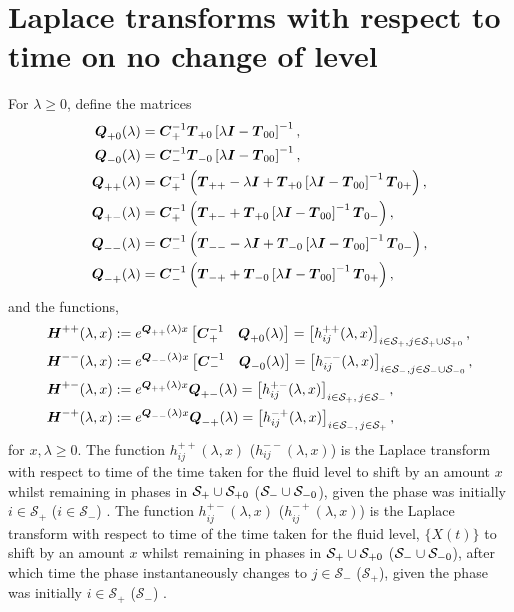 \section{Laplace transforms with respect to time on no change of level}\label{sec: lst on no change}
For \(\lambda \geq 0\), define the matrices
\begin{align*}
	\boldsymbol Q_{+0}(\lambda) &= \boldsymbol C_+^{-1}\boldsymbol T_{+0}\left[\lambda \boldsymbol I - \boldsymbol T_{00}\right]^{-1},
	\\\boldsymbol Q_{-0}(\lambda) &= \boldsymbol C_-^{-1}\boldsymbol T_{-0}\left[\lambda \boldsymbol I - \boldsymbol T_{00}\right]^{-1},
	\\\boldsymbol Q_{++}(\lambda) &= \boldsymbol C_+^{-1} \left(\boldsymbol T_{++} - \lambda \boldsymbol I + \boldsymbol T_{+0}\left[\lambda \boldsymbol I - \boldsymbol T_{00}\right]^{-1}\boldsymbol T_{0+}\right),
	\\\boldsymbol Q_{+-}(\lambda) &= \boldsymbol C_+^{-1} \left(\boldsymbol T_{+-} + \boldsymbol T_{+0}\left[\lambda \boldsymbol I - \boldsymbol T_{00}\right]^{-1}\boldsymbol T_{0-} \right) ,
	\\\boldsymbol Q_{--}(\lambda) &= \boldsymbol C_-^{-1} \left(\boldsymbol T_{--}  - \lambda \boldsymbol I + \boldsymbol T_{-0}\left[\lambda \boldsymbol I - \boldsymbol T_{00}\right]^{-1}\boldsymbol T_{0-}\right),
	\\\boldsymbol Q_{-+}(\lambda) &=\boldsymbol C_-^{-1} \left(\boldsymbol T_{-+}+ \boldsymbol T_{-0}\left[\lambda \boldsymbol I - \boldsymbol T_{00}\right]^{-1}\boldsymbol T_{0+}\right) ,
\end{align*}
and the functions,
\begin{align}
	\boldsymbol H^{++}(\lambda,x) &:= e^{\boldsymbol{Q}_{++}(\lambda)x}\begin{bmatrix} \boldsymbol C_+^{-1} & \boldsymbol Q_{+0}(\lambda) \end{bmatrix} = \left[h_{ij}^{++}(\lambda,x)\right]_{i\in \mathcal S_+,j\in\mathcal S_{+}\cup\mathcal{S}_{+0}}, \label{eqn: lst 1}
	\\\boldsymbol H^{--}(\lambda,x) &:= e^{\boldsymbol{Q}_{--}(\lambda)x}\begin{bmatrix} \boldsymbol C_-^{-1} & \boldsymbol Q_{-0}(\lambda) \end{bmatrix} = \left[h_{ij}^{--}(\lambda,x)\right]_{i\in\mathcal S_-,j\in\mathcal S_{-}\cup\mathcal{S}_{-0}},
	\\\boldsymbol H^{+-}(\lambda,x) &:= e^{\boldsymbol{Q}_{++}(\lambda)x}\boldsymbol{Q}_{+-}(\lambda) = \left[h_{ij}^{+-}(\lambda,x)\right]_{i\in\mathcal S_+,\,j\in\mathcal S_-}, 
	\\\boldsymbol H^{-+}(\lambda,x) &:= e^{\boldsymbol{Q}_{--}(\lambda)x}\boldsymbol{Q}_{-+}(\lambda) = \left[h_{ij}^{-+}(\lambda,x)\right]_{i\in\mathcal S_-,\, j\in\mathcal S_+}, \label{eqn: lst 4}
\end{align}
for \(x,\lambda\geq 0\). The function \(h_{ij}^{++}(\lambda,x)\) (\(h_{ij}^{--}(\lambda,x)\)) is the Laplace transform with respect to time of the time taken for the fluid level to shift by an amount \(x\) whilst remaining in phases in \(\mathcal S_+\cup\mathcal{S}_{+0}\) (\(\mathcal S_-\cup\mathcal{S}_{-0}\)), given the phase was initially \(i\in\mathcal S_+\) (\(i\in\mathcal S_-\)) \cite{bean2005}. The function \(h_{ij}^{+-}(\lambda,x)\) (\(h_{ij}^{-+}(\lambda,x)\)) is the Laplace transform with respect to time of the time taken for the fluid level, \(\{X(t)\}\) to shift by an amount \(x\) whilst remaining in phases in \(\mathcal S_+\cup\mathcal{S}_{+0}\) (\(\mathcal S_-\cup\mathcal{S}_{-0}\)), after which time the phase instantaneously changes to \(j\in\mathcal S_-\) (\(\mathcal S_+\)), given the phase was initially \(i\in\mathcal S_+\) (\(\mathcal S_-\)) \cite{bean2005}.

